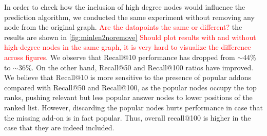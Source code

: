 \documentclass[11pt,oneside]{book}
\begin{document}

In order to check how the inclusion of high degree nodes would influence
the prediction algorithm, we conducted the same experiment without removing any node
from the original graph. \textcolor{red}{Are the datapoints the same or different?} the results are shown in
\autoref{fig:minlen2noremove} \textcolor{red}{Should plot results with and  without high-degree nodes in the same graph, it is very hard to visualize the difference across figures}. We observe that Recall@10 performance has
dropped from {$\sim$}44\% to {$\sim$}36\%. On the other hand, Recall@50 and
Recall@100 ratios have improved. We believe that Recall@10 is more sensitive to the presence of popular addons compared with Recall@50 and
Recall@100, as the popular nodes occupy the top ranks, pushing relevant but less popular answer nodes to lower positions of the ranked list. However, discarding the popular nodes hurts performance in case that the missing add-on is in fact popular. Thus, overall recall@100 is higher in the case that they are indeed included. 
\end{document}
